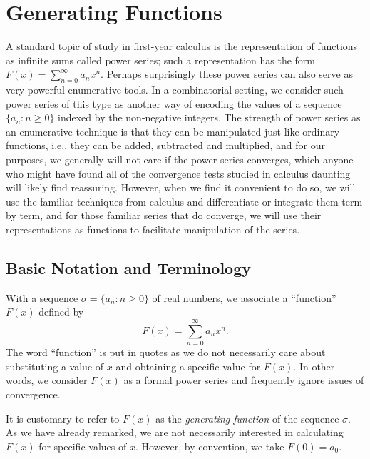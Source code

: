 
\chapter{Generating Functions}\label{ch:genfunction}

A standard topic of study in first-year calculus is the representation
of functions as infinite sums called power series; such a
representation has the form $F(x)=\sum_{n=0}^\infty a_nx^n$. Perhaps
surprisingly these power series can also serve as very powerful
enumerative tools. In a combinatorial setting, we consider such power
series of this type as another way of encoding the values of a
sequence $\{a_n:n\ge0\}$ indexed by the non-negative integers. The
strength of power series as an enumerative technique is that they can
be manipulated just like ordinary functions, i.e., they can be added,
subtracted and multiplied, and for our purposes, we generally will not
care if the power series converges, which anyone who might have found
all of the convergence tests studied in calculus daunting will likely
find reassuring. However, when we find it convenient to do so, we will
use the familiar techniques from calculus and differentiate or
integrate them term by term, and for those familiar series that do
converge, we will use their representations as functions to facilitate
manipulation of the series.

\section{Basic Notation and Terminology}\label{s:genfunction:intro}

With a sequence $\sigma=\{a_n:n\ge0\}$ of real numbers, we associate
a ``function''  $F(x)$ defined by 
\[
F(x)=\sum_{n=0}^\infty a_n x^n.
\]
The word ``function'' is put in quotes as we do not necessarily
care about substituting a value of $x$ and obtaining a specific
value for $F(x)$.  In other words, we consider $F(x)$ as
a formal power series and frequently ignore issues of convergence.

It is customary to refer to $F(x)$ as the \textit{generating function}
of the sequence $\sigma$.  As we have already remarked, we are not
necessarily interested in calculating $F(x)$ for specific values of
$x$.  However, by convention, we take $F(0)=a_0$.

